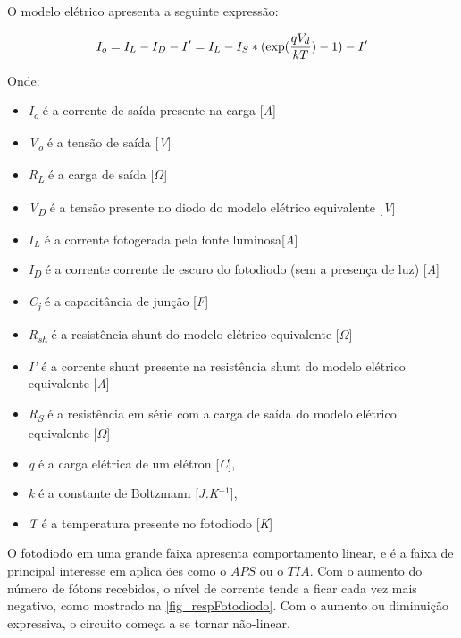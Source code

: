     O modelo el\'etrico apresenta a seguinte expressão:

\begin{equation}
    \label{eq_modEletFot}
    I_o = I_L - I_D - I\rq = I_L - I_S*(\exp (\frac{qV_d}{kT})-1) - I\rq
\end{equation}

Onde:
\begin{itemize}
    \item \textit{I\textsubscript{o}} \'e a corrente de saída presente na carga [\textit{A}]
    \item \textit{V\textsubscript{o}} \'e a tensão de saída [\textit{V}]
    \item \textit{R\textsubscript{L}} \'e a carga de saída [\textit{$\Omega$}]
    \item \textit{V\textsubscript{D}} \'e a tensão presente no diodo do modelo el\'etrico equivalente [\textit{V}]
    \item $I_L$ \'e a corrente fotogerada pela fonte luminosa[\textit{A}]
    \item  \textit{I\textsubscript{D}} \'e a corrente corrente de escuro do fotodiodo (sem a presença de luz) [\textit{A}]
    \item \textit{C\textsubscript{j}} \'e a capacit\^ancia de junção [\textit{F}]
    \item \textit{R\textsubscript{sh}} \'e a resist\^encia shunt do modelo el\'etrico equivalente [$\Omega$]
    \item \textit{I\rq} \'e a corrente shunt presente na resistência shunt do modelo el\'etrico equivalente [\textit{A}]
    \item \textit{R\textsubscript{S}} \'e a resistência em s\'erie com a carga de saída do modelo el\'etrico equivalente [$\Omega$]
    \item \textit{q} \'e a carga el\'etrica de um el\'etron [\textit{C}],
    \item \textit{k} \'e a constante de Boltzmann [\textit{J.K$^{-1}$}],
    \item \textit{T} \'e a temperatura presente no fotodiodo [\textit{K}]
\end{itemize}

O fotodiodo em uma grande faixa apresenta comportamento linear, e \'e a faixa de principal interesse em aplica ões como o $APS$ ou o $TIA$. Com o aumento do n\'umero de f\'otons recebidos, o n\'ivel de corrente tende a ficar cada vez mais negativo, como mostrado na \autoref{fig_respFotodiodo}. Com o aumento ou diminuição expressiva, o circuito começa a se tornar não-linear.

